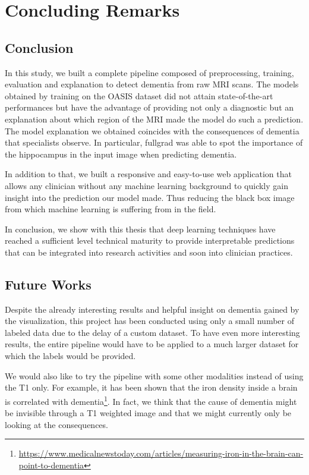 \chapter{Concluding Remarks}
\label{chap:conculusion}

\section{Conclusion}
In this study, we built a complete pipeline composed of preprocessing, training, evaluation and explanation to detect dementia from raw MRI scans. The models obtained by training on the OASIS dataset did not attain state-of-the-art performances but have the advantage of providing not only a diagnostic but an explanation about which region of the MRI made the model do such a prediction. The model explanation we obtained coincides with the consequences of dementia that specialists observe. In particular, fullgrad was able to spot the importance of the hippocampus in the input image when predicting dementia.

In addition to that, we built a responsive and easy-to-use web application that allows any clinician without any machine learning background to quickly gain insight into the prediction our model made. Thus reducing the black box image from which machine learning is suffering from in the field.  

In conclusion, we show with this thesis that deep learning techniques have reached a sufficient level technical maturity to provide interpretable predictions that can be integrated into research activities and soon into clinician practices.

\section{Future Works}
Despite the already interesting results and helpful insight on dementia gained by the visualization, this project has been conducted using only a small number of labeled data due to the delay of a custom dataset. To have even more interesting results, the entire pipeline would have to be applied to a much larger dataset for which the labels would be provided.

We would also like to try the pipeline with some other modalities instead of using the T1 only. For example, it has been shown that the iron density inside a brain is correlated with dementia\footnote{\href{https://www.medicalnewstoday.com/articles/measuring-iron-in-the-brain-can-point-to-dementia}{https://www.medicalnewstoday.com/articles/measuring-iron-in-the-brain-can-point-to-dementia}}. In fact, we think that the cause of dementia might be invisible through a T1 weighted image and that we might currently only be looking at the consequences.

